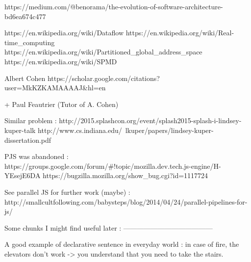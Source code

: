 https://medium.com/@benorama/the-evolution-of-software-architecture-bd6ea674c477

https://en.wikipedia.org/wiki/Dataflow
https://en.wikipedia.org/wiki/Real-time_computing
https://en.wikipedia.org/wiki/Partitioned_global_address_space
https://en.wikipedia.org/wiki/SPMD

Albert Cohen
https://scholar.google.com/citations?user=MkKZKAMAAAAJ&hl=en

+ Paul Feautrier (Tutor of A. Cohen)


Similar problem :
http://2015.splashcon.org/event/splash2015-splash-i-lindsey-kuper-talk
http://www.cs.indiana.edu/~lkuper/papers/lindsey-kuper-dissertation.pdf

PJS was abandoned :
https://groups.google.com/forum/#!topic/mozilla.dev.tech.js-engine/H-YEsejE6DA
https://bugzilla.mozilla.org/show_bug.cgi?id=1117724

See parallel JS for further work (maybe) :
http://smallcultfollowing.com/babysteps/blog/2014/04/24/parallel-pipelines-for-js/

Some chunks I might find useful later :
---------------------------------------

A good example of declarative sentence in everyday world : in case of fire, 
the elevators don't work -> you understand that you need to take the stairs.